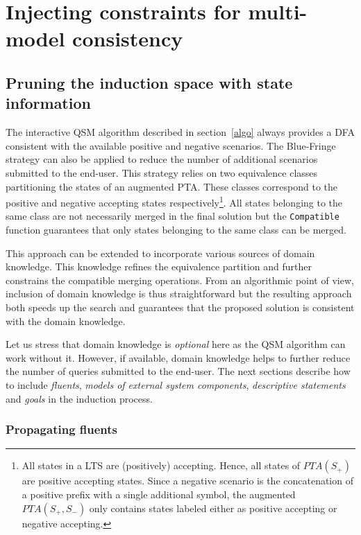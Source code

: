 \section{Injecting constraints for multi-model consistency\label{section:inductive-mutliview-consistency}}

\subsection{Pruning the induction space with state information\label{subsection:induction-pruning-with-state-info}}

The interactive QSM algorithm described in section~\ref{algo} always provides a DFA consistent with the available positive and negative scenarios. The Blue-Fringe strategy can also be applied to reduce the number of additional scenarios submitted to the end-user. This strategy relies on two equivalence classes partitioning the states of an augmented PTA. These classes correspond to the positive and negative accepting states respectively\footnote{All states in a LTS are (positively) accepting. Hence, all states of $PTA(S_+)$ are positive accepting states. Since a negative scenario is the concatenation of a positive prefix with a single additional symbol, the augmented $PTA(S_+, S_-)$ only contains states labeled either as positive accepting or negative accepting.}. All states belonging to the same class are not necessarily merged in the final solution but the \texttt{Compatible} function guarantees that only states belonging to the same class can be merged.

This approach can be extended to incorporate various sources of domain knowledge. This knowledge refines the equivalence partition and further constrains the compatible merging operations. From an algorithmic point of view, inclusion of domain knowledge is thus straightforward but the resulting approach both speeds up the search and guarantees that the proposed solution is consistent with the domain knowledge.

Let us stress that domain knowledge is \textsl{optional} here as the QSM algorithm can work without it. However, if available, domain knowledge helps to further reduce the number of queries submitted to the end-user. The next sections describe how to include \textsl{fluents}, \textsl{models of external system components}, \textsl{descriptive statements} and \textsl{goals} in the induction process.

\subsubsection*{Propagating fluents}

